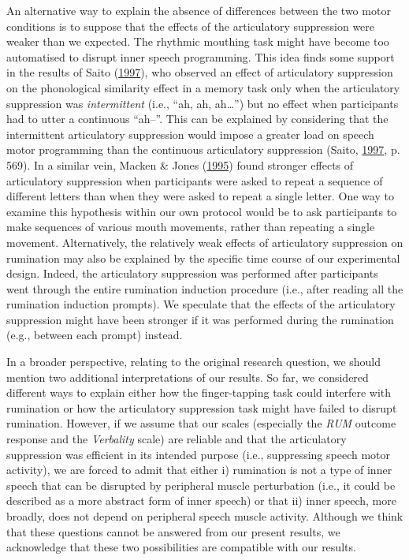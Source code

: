 \documentclass[a4paper,12pt,twoside,onecolumn,openright,final,oldfontcommands]{memoir}
\begin{document}
An alternative way to explain the absence of differences between the two motor conditions is to suppose that the effects of the articulatory suppression were weaker than we expected. The rhythmic mouthing task might have become too automatised to disrupt inner speech programming. This idea finds some support in the results of Saito (\protect\hyperlink{ref-saito_when_1997}{1997}), who observed an effect of articulatory suppression on the phonological similarity effect in a memory task only when the articulatory suppression was \emph{intermittent} (i.e., \enquote{ah, ah, ah\ldots{}}) but no effect when participants had to utter a continuous \enquote{ah--}. This can be explained by considering that the intermittent articulatory suppression would impose a greater load on speech motor programming than the continuous articulatory suppression (Saito, \protect\hyperlink{ref-saito_when_1997}{1997}, p. 569). In a similar vein, Macken \& Jones (\protect\hyperlink{ref-macken_functional_1995}{1995}) found stronger effects of articulatory suppression when participants were asked to repeat a sequence of different letters than when they were asked to repeat a single letter. One way to examine this hypothesis within our own protocol would be to ask participants to make sequences of various mouth movements, rather than repeating a single movement. Alternatively, the relatively weak effects of articulatory suppression on rumination may also be explained by the specific time course of our experimental design. Indeed, the articulatory suppression was performed after participants went through the entire rumination induction procedure (i.e., after reading all the rumination induction prompts). We speculate that the effects of the articulatory suppression might have been stronger if it was performed during the rumination (e.g., between each prompt) instead.

In a broader perspective, relating to the original research question, we should mention two additional interpretations of our results. So far, we considered different ways to explain either how the finger-tapping task could interfere with rumination or how the articulatory suppression task might have failed to disrupt rumination. However, if we assume that our scales (especially the \emph{RUM} outcome response and the \emph{Verbality} scale) are reliable and that the articulatory suppression was efficient in its intended purpose (i.e., suppressing speech motor activity), we are forced to admit that either i) rumination is not a type of inner speech that can be disrupted by peripheral muscle perturbation (i.e., it could be described as a more abstract form of inner speech) or that ii) inner speech, more broadly, does not depend on peripheral speech muscle activity. Although we think that these questions cannot be answered from our present results, we acknowledge that these two possibilities are compatible with our results.
\end{document}

